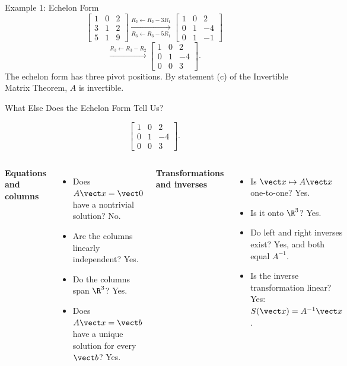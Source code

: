 \begin{frame}{Example 1: Echelon Form}
\small
\[
\begin{bmatrix}
1&0&2\\3&1&2\\5&1&9
\end{bmatrix}
\xrightarrow[ R_3\leftarrow R_3-5R_1]{R_2\leftarrow R_2-3R_1}
\begin{bmatrix}
1&0&2\\0&1&-4\\0&1&-1
\end{bmatrix}
\]
\pause
\[
\xrightarrow{R_3\leftarrow R_3-R_2}
\begin{bmatrix}
1&0&2\\0&1&-4\\0&0&3
\end{bmatrix}.
\]
\pause
The echelon form has three pivot positions. By statement (c) of the Invertible Matrix Theorem, $A$ is invertible.
\end{frame}

\begin{frame}[shrink=6]{What Else Does the Echelon Form Tell Us?}
  \begin{center}
    \[
\begin{bmatrix}
1&0&2\\0&1&-4\\0&0&3
\end{bmatrix}.
\]
  \end{center}
\begin{columns}[T]
\textbf{Equations and columns}
\begin{itemize}
  \item Does $A\vect x=\vect0$ have a nontrivial solution? \pause No.
  \item Are the columns linearly independent? \pause Yes.
  \item Do the columns span $\R^3$? \pause Yes.
  \item Does $A\vect x=\vect b$ have a unique solution for every $\vect b$? \pause Yes.
\end{itemize}
\textbf{Transformations and inverses}
\begin{itemize}
  \item Is $\vect x\mapsto A\vect x$ one-to-one? \pause Yes.
  \item Is it onto $\R^3$? \pause Yes.
  \item Do left and right inverses exist? \pause Yes, and both equal $A^{-1}$.
  \item Is the inverse transformation linear? \pause Yes: $S(\vect x)=A^{-1}\vect x$.
\end{itemize}
\end{columns}
\end{frame}

